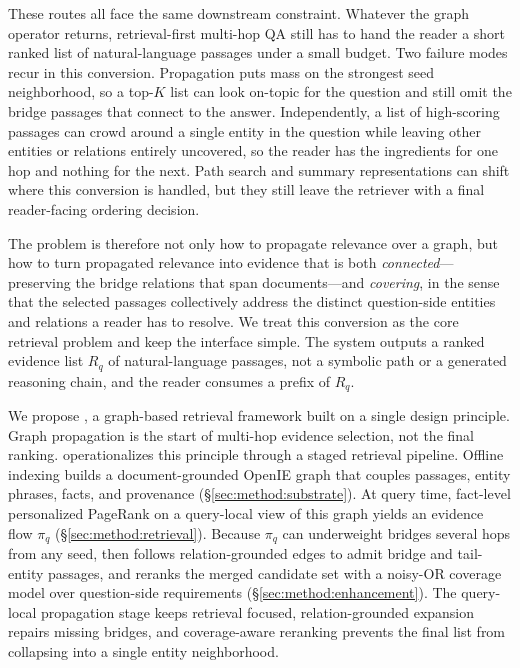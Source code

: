 These routes all face the same downstream constraint. Whatever the
graph operator returns, retrieval-first multi-hop QA still has to hand
the reader a short ranked list of natural-language passages under a
small budget. Two failure modes recur in this conversion. Propagation
puts mass on the strongest seed neighborhood, so a top-$K$ list can
look on-topic for the question and still omit the bridge passages that
connect to the answer. Independently, a list of high-scoring passages
can crowd around a single entity in the question while leaving other
entities or relations entirely uncovered, so the reader has the
ingredients for one hop and nothing for the next. Path search and
summary representations can shift where this conversion is handled, but
they still leave the retriever with a final reader-facing ordering
decision.

The problem is therefore not only how to propagate relevance over a
graph, but how to turn propagated relevance into evidence that is both
\emph{connected}---preserving the bridge relations that span
documents---and \emph{covering}, in the sense that the selected
passages collectively address the distinct question-side entities and
relations a reader has to resolve. We treat this conversion as the core
retrieval problem and keep the interface simple. The system outputs a
ranked evidence list $R_q$ of natural-language passages, not a symbolic
path or a generated reasoning chain, and the reader consumes a prefix
of $R_q$.

We propose \methodname{}, a graph-based retrieval framework built on a
single design principle. Graph propagation is the start of multi-hop
evidence selection, not the final ranking. \methodname{} operationalizes
this principle through a staged retrieval pipeline. Offline indexing
builds a document-grounded OpenIE graph that
couples passages, entity phrases, facts, and provenance
(\S\ref{sec:method:substrate}). At query time, fact-level personalized
PageRank on a query-local view of this graph yields an evidence flow
$\pi_q$ (\S\ref{sec:method:retrieval}). Because $\pi_q$ can underweight
bridges several hops from any seed, \methodname{} then follows
relation-grounded edges to admit bridge and tail-entity passages, and
reranks the merged candidate set with a noisy-OR coverage model over
question-side requirements (\S\ref{sec:method:enhancement}). The
query-local propagation stage keeps retrieval focused,
relation-grounded expansion repairs missing bridges, and coverage-aware
reranking prevents the final list from collapsing into a single entity
neighborhood.

